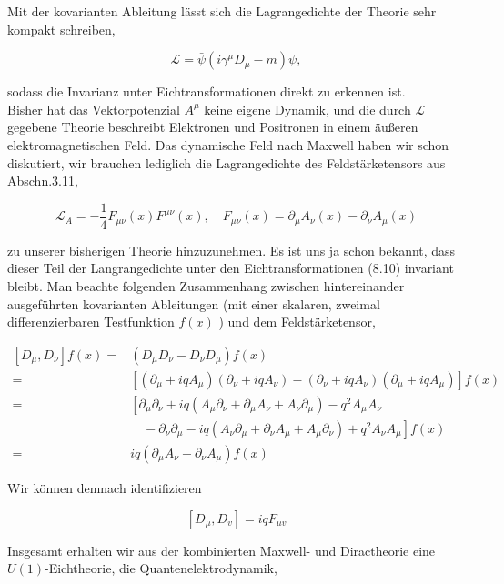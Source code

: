 \documentclass[10pt, letterpaper]{article}
\begin{document}
Mit der kovarianten Ableitung lässt sich die Lagrangedichte der Theorie sehr kompakt schreiben,

$$
\mathscr{L}=\bar{\psi}\left(i \gamma^{\mu} D_{\mu}-m\right) \psi,
$$

sodass die Invarianz unter Eichtransformationen direkt zu erkennen ist.\\
Bisher hat das Vektorpotenzial $A^{\mu}$ keine eigene Dynamik, und die durch $\mathscr{L}$ gegebene Theorie beschreibt Elektronen und Positronen in einem äußeren elektromagnetischen Feld. Das dynamische Feld nach Maxwell haben wir schon diskutiert, wir brauchen lediglich die Lagrangedichte des Feldstärketensors aus Abschn.3.11,

$$
\mathscr{L}_{A}=-\frac{1}{4} F_{\mu \nu}(x) F^{\mu \nu}(x), \quad F_{\mu \nu}(x)=\partial_{\mu} A_{\nu}(x)-\partial_{\nu} A_{\mu}(x)
$$

zu unserer bisherigen Theorie hinzuzunehmen. Es ist uns ja schon bekannt, dass dieser Teil der Langrangedichte unter den Eichtransformationen (8.10) invariant bleibt. Man beachte folgenden Zusammenhang zwischen hintereinander ausgeführten kovarianten Ableitungen (mit einer skalaren, zweimal differenzierbaren Testfunktion $f(x)$ ) und dem Feldstärketensor,

$$
\begin{aligned}
{\left[D_{\mu}, D_{\nu}\right] f(x)=} & \left(D_{\mu} D_{\nu}-D_{\nu} D_{\mu}\right) f(x) \\
= & {\left[\left(\partial_{\mu}+i q A_{\mu}\right)\left(\partial_{\nu}+i q A_{\nu}\right)-\left(\partial_{\nu}+i q A_{\nu}\right)\left(\partial_{\mu}+i q A_{\mu}\right)\right] f(x) } \\
= & {\left[\partial_{\mu} \partial_{\nu}+i q\left(A_{\mu} \partial_{\nu}+\partial_{\mu} A_{\nu}+A_{\nu} \partial_{\mu}\right)-q^{2} A_{\mu} A_{\nu}\right.} \\
& \left.\quad-\partial_{\nu} \partial_{\mu}-i q\left(A_{\nu} \partial_{\mu}+\partial_{\nu} A_{\mu}+A_{\mu} \partial_{\nu}\right)+q^{2} A_{\nu} A_{\mu}\right] f(x) \\
= & i q\left(\partial_{\mu} A_{\nu}-\partial_{\nu} A_{\mu}\right) f(x)
\end{aligned}
$$

Wir können demnach identifizieren

$$
\left[D_{\mu}, D_{v}\right]=i q F_{\mu v}
$$

Insgesamt erhalten wir aus der kombinierten Maxwell- und Diractheorie eine $U(1)$-Eichtheorie, die Quantenelektrodynamik,
\end{document}
